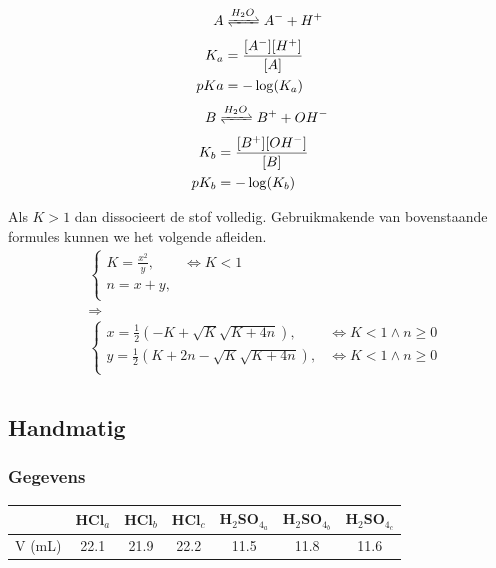 \documentclass[11pt]{report}
\begin{document}
\begin{multicols}{2}
\begin{equation*}
    \begin{split}
        A &\xrightleftharpoons[]{H_2O} A^- + H^+\\
        K_a &= \frac{[A^-][H^+]}{[A]}\\
        pKa &= -\log(K_a)\\
    \end{split}
\end{equation*}
\break
\begin{equation*}
    \begin{split}
        B &\xrightleftharpoons[]{H_2O} B^+ + OH^-\\
        K_b &= \frac{[B^+][OH^-]}{[B]}\\
        pK_b &= -\log(K_b)\\
    \end{split}
\end{equation*}
\end{multicols}
Als $K > 1$ dan dissocieert de stof volledig. Gebruikmakende van bovenstaande formules kunnen we het volgende afleiden.\\
\begin{equation*}
    \begin{split}
        &\begin{cases}
            K = \frac{x^2}{y}, & \iff K < 1\\
            n = x + y, & \\
        \end{cases}\\
        &\Longrightarrow\\
        &\begin{cases}
            x = \frac{1}{2}(-K + \sqrt{K}\sqrt{K + 4n}), & \iff K < 1 \wedge n \geq 0 \\
            y = \frac{1}{2}(K + 2n - \sqrt{K}\sqrt{K + 4n}), & \iff K < 1 \wedge n \geq 0\\
        \end{cases}\\
    \end{split}
\end{equation*}

\newpage

\subsection{Handmatig}
\subsubsection{Gegevens}
\begin{tabular}{|l|c|c|c||c|c|c|}
    \hline
      & HCl$_a$ & HCl$_b$ & HCl$_c$ & H$_2$SO$_{4_a}$ & H$_2$SO$_{4_b}$ & H$_2$SO$_{4_c}$ \\\hline
    V (mL) & 22.1 & 21.9 & 22.2 & 11.5 & 11.8 & 11.6 \\\hline
\end{tabular}
\end{document}
